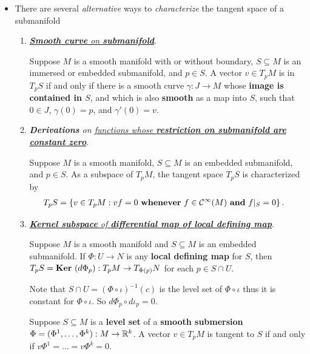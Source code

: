 \documentclass[11pt]{article}
\begin{document}
\begin{itemize}
\item There are several \emph{alternative} ways to \emph{characterize} the tangent space of a submanifold 
\begin{enumerate}
\item \underline{\emph{\textbf{Smooth curve} on \textbf{submanifold}}}. 
\begin{proposition}
Suppose $M$ is a smooth manifold with or without boundary, $S\subseteq M$ is an immersed or embedded submanifold, and $p \in S$. A vector $v \in T_{p}M$ is
in $T_{p}S$ if and only if there is a smooth curve  $\gamma: J \rightarrow M$ whose \textbf{image is contained in $S$}, and which is also \textbf{smooth} as a map into $S$, such that $0 \in J$, $\gamma(0) = p$, and $\gamma'(0) = v$.
\end{proposition}

\item \emph{\textbf{Derivations} on \underline{functions whose \textbf{restriction on submanifold are constant zero}}}.
\begin{proposition}
Suppose $M$ is a smooth manifold, $S\subseteq M$ is an embedded submanifold, and $p \in S$. As a subspace of $T_{p}M$, the tangent space $T_{p}S$ is characterized
by
\begin{align*}
T_{p}S &= \left\{v \in T_{p}M: vf = 0\text{ \textbf{whenever} }f \in {\mathcal C}^{\infty}(M)\text{ \textbf{and} }f|_{S} = 0\right\}.
\end{align*}
\end{proposition}

\item \underline{\emph{\textbf{Kernel subspace} of \textbf{differential map of local defining map}}}.
\begin{proposition}
Suppose $M$ is a smooth manifold and $S \subseteq M$ is an embedded submanifold. If $\Phi: U \rightarrow N$ is any \textbf{local defining map} for $S$, then $T_{p}S = 
\text{\textbf{Ker} }(d\Phi_{p}): T_{p}M \rightarrow T_{\Phi(p)}N$ for each $p \in S \cap U$.
\end{proposition} Note that $S\cap U = (\Phi \circ \iota)^{-1}(c)$ is the level set of $\Phi \circ \iota$ thus it is constant for $\Phi \circ \iota$. So $d\Phi_p \circ d\iota_p = 0$.

\begin{corollary}
Suppose $S \subseteq M$ is a \textbf{level set} of a \textbf{smooth submersion} $\Phi = (\Phi^1,\ldots,\Phi^k): M \rightarrow {\mathbb R}^k$. A vector $v \in T_{p}M$ is tangent to $S$ if and only if $v\Phi^1 = \ldots = v\Phi^k = 0$.
\end{corollary}
\end{enumerate}


\end{itemize}
\end{document}
